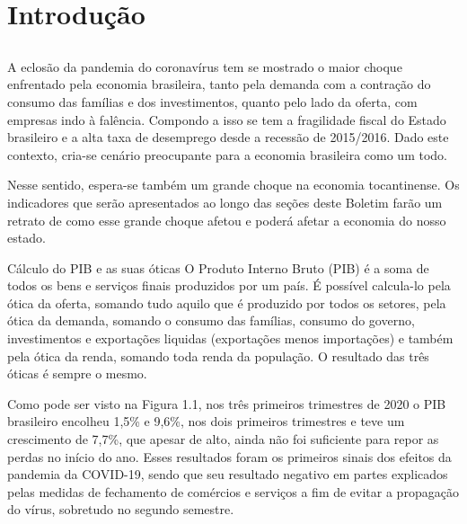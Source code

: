 \chapter{Introdução}
\section{}
\par A eclosão da pandemia do coronavírus tem se mostrado o maior choque enfrentado pela economia brasileira, tanto pela demanda com a contração do consumo das famílias e dos investimentos, quanto pelo lado da oferta, com empresas indo à falência. Compondo a isso se tem a fragilidade fiscal do Estado brasileiro e a alta taxa de desemprego desde a recessão de 2015/2016. Dado este contexto, cria-se cenário preocupante para a economia brasileira como um todo.
\par Nesse sentido, espera-se também um grande choque na economia tocantinense. Os indicadores que serão apresentados ao longo das seções deste Boletim farão um retrato de como esse grande choque afetou e poderá afetar a economia do nosso estado.
\begin{smbox}[label={labelbox},nameref={Cálculo do PIB e as suas óticas}]{Cálculo do PIB e as suas óticas}
	O Produto Interno Bruto (PIB) é a soma de todos os bens e serviços finais produzidos por um país. É possível calcula-lo pela ótica da oferta, somando tudo aquilo que é produzido por todos os setores, pela ótica da demanda, somando o consumo das famílias, consumo do governo, investimentos e exportações liquidas (exportações menos importações) e também pela ótica da renda, somando toda renda da população. O resultado das três óticas é sempre o mesmo.
\end{smbox}
\par Como pode ser visto na Figura 1.1, nos três primeiros trimestres de 2020 o PIB brasileiro encolheu 1,5\% e 9,6\%, nos dois primeiros trimestres e teve um crescimento de 7,7\%, que apesar de alto, ainda não foi suficiente para repor as perdas no início do ano. Esses resultados foram os primeiros sinais dos efeitos da pandemia da COVID-19, sendo que seu resultado negativo em partes explicados pelas medidas de fechamento de comércios e serviços a fim de evitar a propagação do vírus, sobretudo no segundo semestre.
